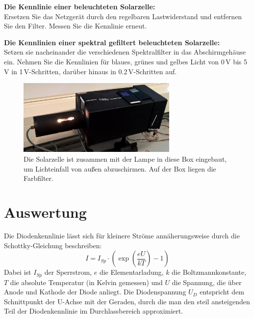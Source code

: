 \begin{enumerate}
	\begin{minipage}{0.6\textwidth}
			\item \textbf{Die Kennlinie einer beleuchteten Solarzelle:}\\
		Ersetzen Sie das Netzgerät durch den regelbaren Lastwiderstand und entfernen Sie den Filter. Messen Sie die Kennlinie erneut.
	\end{minipage}
	\begin{minipage}{0.4\textwidth}
		
		\label{fig:solarzelle }
		\end{minipage}
	\item \textbf{Die Kennlinien einer spektral gefiltert beleuchteten Solarzelle:}\\
		Setzen sie nacheinander die verschiedenen Spektralfilter in das Abschirmgehäuse ein. Nehmen Sie die Kennlinien für blaues, grünes und gelbes Licht von 0\,V bis 5\,V in 1\,V-Schritten, darüber hinaus in 0.2\,V-Schritten auf.
\end{enumerate}

\begin{figure}[h]
	\centering
	\includegraphics[width=0.7\textwidth]{Abbildungen/Solarzelle_gross.jpg}
	\caption{Die Solarzelle ist zusammen mit der Lampe in diese Box eingebaut, um Lichteinfall von außen abzuschirmen. Auf der Box liegen die Farbfilter.}
\end{figure}

\section{Auswertung} 

Die Diodenkennlinie lässt sich für kleinere Ströme annäherungsweise durch die Schottky-Gleichung beschreiben:
\begin{equation}
I = I_{Sp}\cdot\left(\exp\left(\frac{eU}{kT}\right)-1\right)
\end{equation}
Dabei ist $I_{Sp}$ der Sperrstrom, $e$ die Elementarladung, $k$ die Boltzmannkonstante, $T$ die absolute Temperatur (in Kelvin gemessen) und $U$ die Spannung, die über Anode und Kathode der Diode anliegt. Die Diodenspannung $U_D$ entspricht dem Schnittpunkt der U-Achse mit der Geraden, durch die man den steil ansteigenden Teil der Diodenkennlinie im Durchlassbereich approximiert.


